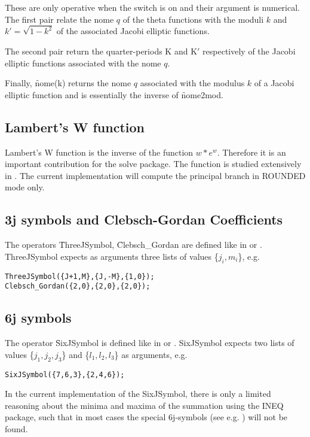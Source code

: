 These are only operative when the switch  is on and their
argument is numerical. The first pair relate the nome $q$ of the theta
functions with the moduli $k$ and $k'=\sqrt{1-k^2}$ of the associated Jacobi
elliptic functions.

The second pair return the quarter-periods K and K$'$ respectively of
the Jacobi elliptic functions associated with the nome $q$.

Finally, \f{nome(k)} returns the nome $q$ associated with the modulus $k$ of
a Jacobi elliptic function and is essentially the inverse of \f{nome2mod}.

\subsection{Lambert's W function}

Lambert's W function is the inverse of the function  $w*e^w$.
Therefore it is an important contribution for the solve package.
The function is studied extensively in \cite{Corless:92}.  
The current implementation will compute the principal branch in
ROUNDED mode only.

\subsection{3j symbols and Clebsch-Gordan Coefficients}
The operators \f{ThreeJSymbol}, \f{Clebsch\_Gordan} are defined like 
in \cite{Landolt:68} or \cite{Edmonds:57}. ThreeJSymbol expects as arguments
three lists of values \{$j_i,m_i$\}, e.g.

\begin{verbatim}
ThreeJSymbol({J+1,M},{J,-M},{1,0});
Clebsch_Gordan({2,0},{2,0},{2,0});
\end{verbatim}

\subsection{6j symbols }
The operator \f{SixJSymbol} is defined like
in \cite{Landolt:68} or \cite{Edmonds:57}.
SixJSymbol expects two lists of values \{$j_1,j_2,j_3$\} and
 \{$l_1,l_2,l_3$\} as arguments, e.g.

\begin{verbatim}
SixJSymbol({7,6,3},{2,4,6});
\end{verbatim}

In the current implementation of the SixJSymbol, there is only a limited
reasoning about the minima and maxima of the summation using
the INEQ package, such that in most
cases the special 6j-symbols (see e.g. \cite{Landolt:68})
will not be found.



